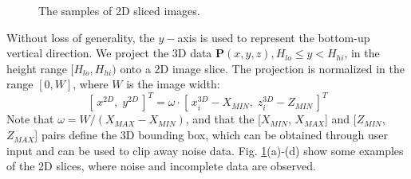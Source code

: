 \documentclass[12pt,letterpaper]{article}
\begin{document}
\begin{figure} [!btp]
  \vspace{.01in}
  \caption{
The samples of 2D sliced images.
}
  \label{fig_slicing}
\end{figure}

Without loss of generality, the $y-$axis is used to represent the bottom-up
vertical direction.
We project the 3D data
$\boldsymbol{P}(x,y,z), H_{lo} \leq y < H_{hi}$, in the height range
$[H_{lo}, H_{hi})$ onto a 2D image slice.
The projection is normalized in the range $[0,W]$,
where $W$ is the image width:
\begin{equation}\label{eq_image_slicing}
[\,x^{2D},\; y^{2D}\,]^T = \omega\cdot[\,x^{3D}_i - X_{MIN},\; z^{3D}_i - Z_{MIN}\,]^T
\end{equation}
Note that $\omega = W/(X_{MAX} - X_{MIN})$, and that
the [$X_{MIN}$, $X_{MAX}$] and [$Z_{MIN}$, $Z_{MAX}$] pairs define the
3D bounding box, which can be obtained through user input and can be used
to clip away noise data. Fig. \ref{fig_slicing}(a)-(d) show some examples of the
2D slices, where noise and incomplete data are observed.
\end{document}
